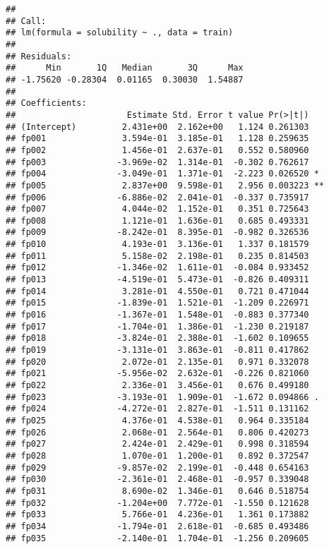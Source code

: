 \documentclass[
]{article}
\begin{document}
\begin{verbatim}
## 
## Call:
## lm(formula = solubility ~ ., data = train)
## 
## Residuals:
##      Min       1Q   Median       3Q      Max 
## -1.75620 -0.28304  0.01165  0.30030  1.54887 
## 
## Coefficients:
##                      Estimate Std. Error t value Pr(>|t|)    
## (Intercept)         2.431e+00  2.162e+00   1.124 0.261303    
## fp001               3.594e-01  3.185e-01   1.128 0.259635    
## fp002               1.456e-01  2.637e-01   0.552 0.580960    
## fp003              -3.969e-02  1.314e-01  -0.302 0.762617    
## fp004              -3.049e-01  1.371e-01  -2.223 0.026520 *  
## fp005               2.837e+00  9.598e-01   2.956 0.003223 ** 
## fp006              -6.886e-02  2.041e-01  -0.337 0.735917    
## fp007               4.044e-02  1.152e-01   0.351 0.725643    
## fp008               1.121e-01  1.636e-01   0.685 0.493331    
## fp009              -8.242e-01  8.395e-01  -0.982 0.326536    
## fp010               4.193e-01  3.136e-01   1.337 0.181579    
## fp011               5.158e-02  2.198e-01   0.235 0.814503    
## fp012              -1.346e-02  1.611e-01  -0.084 0.933452    
## fp013              -4.519e-01  5.473e-01  -0.826 0.409311    
## fp014               3.281e-01  4.550e-01   0.721 0.471044    
## fp015              -1.839e-01  1.521e-01  -1.209 0.226971    
## fp016              -1.367e-01  1.548e-01  -0.883 0.377340    
## fp017              -1.704e-01  1.386e-01  -1.230 0.219187    
## fp018              -3.824e-01  2.388e-01  -1.602 0.109655    
## fp019              -3.131e-01  3.863e-01  -0.811 0.417862    
## fp020               2.072e-01  2.135e-01   0.971 0.332078    
## fp021              -5.956e-02  2.632e-01  -0.226 0.821060    
## fp022               2.336e-01  3.456e-01   0.676 0.499180    
## fp023              -3.193e-01  1.909e-01  -1.672 0.094866 .  
## fp024              -4.272e-01  2.827e-01  -1.511 0.131162    
## fp025               4.376e-01  4.538e-01   0.964 0.335184    
## fp026               2.068e-01  2.564e-01   0.806 0.420273    
## fp027               2.424e-01  2.429e-01   0.998 0.318594    
## fp028               1.070e-01  1.200e-01   0.892 0.372547    
## fp029              -9.857e-02  2.199e-01  -0.448 0.654163    
## fp030              -2.361e-01  2.468e-01  -0.957 0.339048    
## fp031               8.690e-02  1.346e-01   0.646 0.518754    
## fp032              -1.204e+00  7.772e-01  -1.550 0.121628    
## fp033               5.766e-01  4.236e-01   1.361 0.173882    
## fp034              -1.794e-01  2.618e-01  -0.685 0.493486    
## fp035              -2.140e-01  1.704e-01  -1.256 0.209605    

\end{verbatim}
\end{document}
